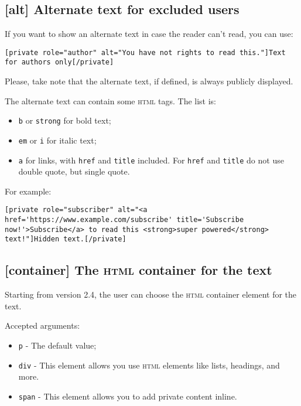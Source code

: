 \documentclass[a4paper,10pt]{article}
\begin{document}
\subsection{[alt] Alternate text for excluded users}

If you want to show an alternate text in case the reader can't read, you can use:

\begin{lstlisting}
[private role="author" alt="You have not rights to read this."]Text for authors only[/private]
\end{lstlisting}

Please, take note that the alternate text, if defined, is always publicly displayed.

The alternate text can contain some \textsc{html} tags. The list is:

\begin{itemize}
 \item \verb+b+ or \verb+strong+ for bold text;
 \item \verb+em+ or \verb+i+ for italic text;
 \item \verb+a+ for links, with \verb+href+ and \verb+title+ included. For \verb+href+ and \verb+title+ do not use double quote, but single quote.
\end{itemize}

For example:

\begin{lstlisting}
[private role="subscriber" alt="<a href='https://www.example.com/subscribe' title='Subscribe now!'>Subscribe</a> to read this <strong>super powered</strong> text!"]Hidden text.[/private]
\end{lstlisting}

\subsection{[container] The \textsc{html} container for the text}

Starting from version 2.4, the user can choose the \textsc{html} container element for the text.

Accepted arguments:

\begin{itemize}
 \item \verb+p+ - The default value;
 \item \verb+div+ - This element allows you use \textsc{html} elements like lists, headings, and more.
 \item \verb+span+ - This element allows you to add private content inline.
\end{itemize}
\end{document}
